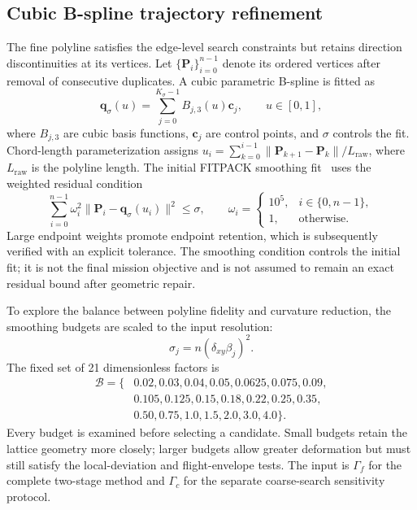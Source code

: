\documentclass[preprint,12pt]{elsarticle}
\begin{document}
\subsection{Cubic B-spline trajectory refinement}
\label{sec:bspline}

The fine polyline satisfies the edge-level search constraints but retains
direction discontinuities at its vertices. Let
$\{\mathbf P_i\}_{i=0}^{n-1}$ denote its ordered vertices after removal of
consecutive duplicates. A cubic parametric B-spline is fitted as
\begin{equation}
 \mathbf q_\sigma(u)=\sum_{j=0}^{K_\sigma-1}
 B_{j,3}(u)\mathbf c_j,\qquad u\in[0,1],
 \label{me:eq:spline}
\end{equation}
where $B_{j,3}$ are cubic basis functions, $\mathbf c_j$ are control points,
and $\sigma$ controls the fit. Chord-length parameterization assigns
$u_i=\sum_{k=0}^{i-1}\|\mathbf P_{k+1}-\mathbf P_k\|/L_{\mathrm{raw}}$,
where $L_{\mathrm{raw}}$ is the polyline length. The initial FITPACK
smoothing fit~\cite{dierckx1993} uses the weighted residual condition
\begin{equation}
 \sum_{i=0}^{n-1}\omega_i^2
       \|\mathbf P_i-\mathbf q_\sigma(u_i)\|^2\le\sigma,
 \qquad
 \omega_i=
 \begin{cases}
 10^5,&i\in\{0,n-1\},\\
 1,&\text{otherwise}.
 \end{cases}
 \label{me:eq:fit}
\end{equation}
Large endpoint weights promote endpoint retention, which is subsequently
verified with an explicit tolerance. The smoothing condition controls the
initial fit; it is not the final mission objective and is not assumed to
remain an exact residual bound after geometric repair.

To explore the balance between polyline fidelity and curvature reduction,
the smoothing budgets are scaled to the input resolution:
\begin{equation}
 \sigma_j=n(\delta_{xy}\beta_j)^2.
 \label{me:eq:budgets}
\end{equation}
The fixed set of 21 dimensionless factors is
\begin{equation}
 \begin{split}
 \mathcal B=\{&0.02,0.03,0.04,0.05,0.0625,0.075,0.09,\\
              &0.105,0.125,0.15,0.18,0.22,0.25,0.35,\\
              &0.50,0.75,1.0,1.5,2.0,3.0,4.0\}.
 \end{split}
 \label{me:eq:budgetset}
\end{equation}
Every budget is examined before selecting a candidate. Small budgets
retain the lattice geometry more closely; larger budgets allow greater
deformation but must still satisfy the local-deviation and flight-envelope
tests. The input is $\Gamma_f$ for the complete two-stage method and
$\Gamma_c$ for the separate coarse-search sensitivity protocol.
\end{document}
